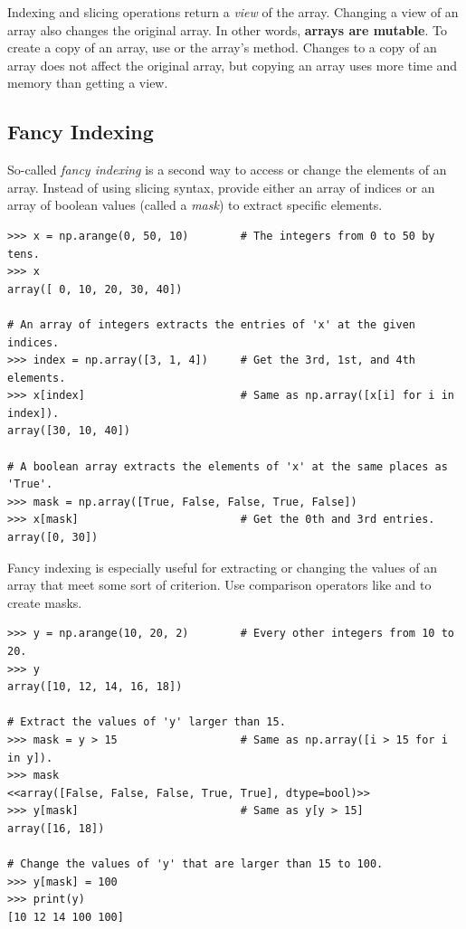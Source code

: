 
\begin{info} %
Indexing and slicing operations return a \emph{view} of the array.
Changing a view of an array also changes the original array.
In other words, \textbf{arrays are mutable}.
To create a copy of an array, use  or the array's  method.
Changes to a copy of an array does not affect the original array, but copying an array uses more time and memory than getting a view.
\end{info}

\subsection*{Fancy Indexing} %

So-called \emph{fancy indexing} is a second way to access or change the elements of an array.
Instead of using slicing syntax, provide either an array of indices or an array of boolean values (called a \emph{mask}) to extract specific elements.

\begin{lstlisting}
>>> x = np.arange(0, 50, 10)        # The integers from 0 to 50 by tens.
>>> x
array([ 0, 10, 20, 30, 40])

# An array of integers extracts the entries of 'x' at the given indices.
>>> index = np.array([3, 1, 4])     # Get the 3rd, 1st, and 4th elements.
>>> x[index]                        # Same as np.array([x[i] for i in index]).
array([30, 10, 40])

# A boolean array extracts the elements of 'x' at the same places as 'True'.
>>> mask = np.array([True, False, False, True, False])
>>> x[mask]                         # Get the 0th and 3rd entries.
array([0, 30])
\end{lstlisting}

Fancy indexing is especially useful for extracting or changing the values of an array that meet some sort of criterion.
Use comparison operators like \li{<} and \li{==} to create masks.

\begin{lstlisting}
>>> y = np.arange(10, 20, 2)        # Every other integers from 10 to 20.
>>> y
array([10, 12, 14, 16, 18])

# Extract the values of 'y' larger than 15.
>>> mask = y > 15                   # Same as np.array([i > 15 for i in y]).
>>> mask
<<array([False, False, False, True, True], dtype=bool)>>
>>> y[mask]                         # Same as y[y > 15]
array([16, 18])

# Change the values of 'y' that are larger than 15 to 100.
>>> y[mask] = 100
>>> print(y)
[10 12 14 100 100]
\end{lstlisting}

